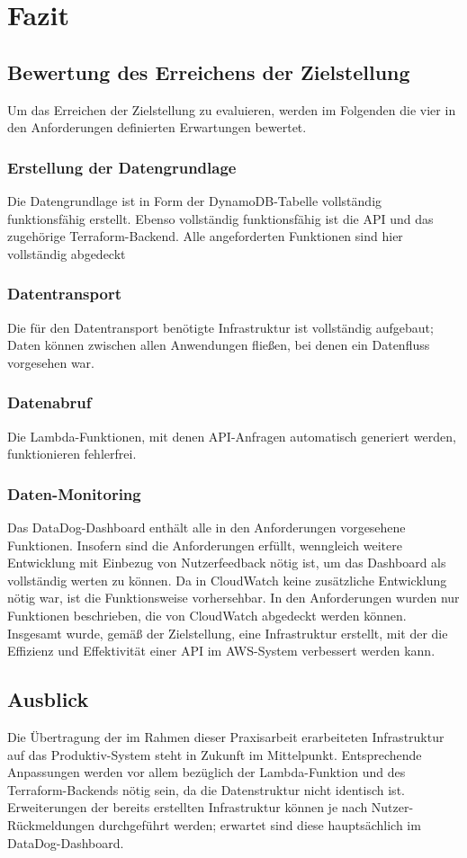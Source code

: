 \section{Fazit} 
\subsection{Bewertung des Erreichens der Zielstellung}
Um das Erreichen der Zielstellung zu evaluieren, werden im Folgenden die vier in den Anforderungen definierten Erwartungen bewertet.
\subsubsection{Erstellung der Datengrundlage}
Die Datengrundlage ist in Form der DynamoDB-Tabelle vollständig funktionsfähig erstellt. Ebenso vollständig funktionsfähig ist die API und das zugehörige Terraform-Backend. Alle angeforderten Funktionen sind hier vollständig abgedeckt
\subsubsection{Datentransport}
Die für den Datentransport benötigte Infrastruktur ist vollständig aufgebaut; Daten können zwischen allen Anwendungen fließen, bei denen ein Datenfluss vorgesehen war. 
\subsubsection{Datenabruf}
Die Lambda-Funktionen, mit denen API-Anfragen automatisch generiert werden, funktionieren fehlerfrei. 
\subsubsection{Daten-Monitoring}
Das DataDog-Dashboard enthält alle in den Anforderungen vorgesehene Funktionen. Insofern sind die Anforderungen erfüllt, wenngleich weitere Entwicklung mit Einbezug von Nutzerfeedback nötig ist, um das Dashboard als vollständig werten zu können.\newline
Da in CloudWatch keine zusätzliche Entwicklung nötig war, ist die Funktionsweise vorhersehbar. In den Anforderungen wurden nur Funktionen beschrieben, die von CloudWatch abgedeckt werden können.
\newline
Insgesamt wurde, gemäß der Zielstellung, eine Infrastruktur erstellt, mit der die Effizienz und Effektivität einer API im AWS-System verbessert werden kann.
\subsection{Ausblick}
Die Übertragung der im Rahmen dieser Praxisarbeit erarbeiteten Infrastruktur auf das Produktiv-System steht in Zukunft im Mittelpunkt. Entsprechende Anpassungen werden vor allem bezüglich der Lambda-Funktion und des Terraform-Backends nötig sein, da die Datenstruktur nicht identisch ist. Erweiterungen der bereits erstellten Infrastruktur können je nach Nutzer-Rückmeldungen durchgeführt werden; erwartet sind diese hauptsächlich im DataDog-Dashboard.